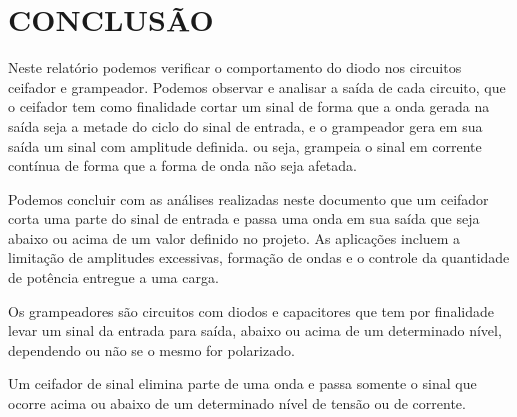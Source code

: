 \chapter{CONCLUSÃO}

Neste relatório podemos verificar o comportamento do diodo nos circuitos ceifador e grampeador. Podemos observar e analisar a saída de cada circuito, que o ceifador tem como finalidade cortar um sinal de forma que a onda gerada na saída seja a metade do ciclo do sinal de entrada, e o grampeador gera em sua saída um sinal com amplitude definida. ou seja, grampeia o sinal em corrente contínua de forma que a forma de onda não seja afetada.

Podemos concluir com as análises realizadas neste documento que um ceifador corta uma parte do sinal de entrada e passa uma onda em sua saída que seja abaixo ou acima de um valor definido no projeto. As aplicações incluem a limitação de amplitudes excessivas, formação de ondas e o controle da quantidade de potência entregue a uma carga.

Os grampeadores são circuitos com diodos e capacitores que tem por finalidade levar um sinal da entrada para saída, abaixo ou acima de um determinado nível, dependendo ou não se o mesmo for polarizado.


Um ceifador de sinal elimina parte de uma onda e passa somente o sinal que ocorre acima ou abaixo de um determinado nível de tensão ou de corrente. 
